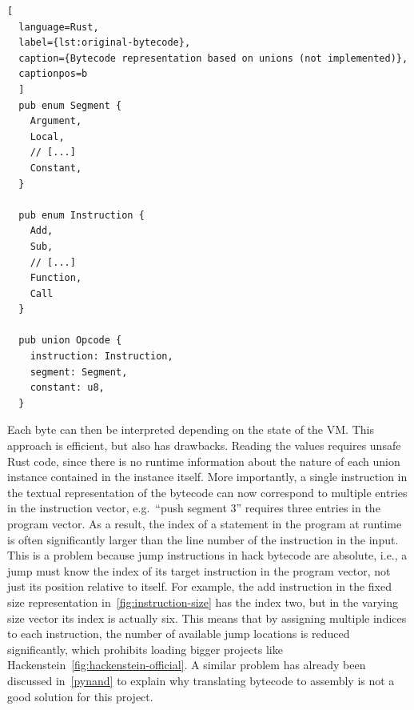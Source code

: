 \begin{lstlisting}[
  language=Rust,
  label={lst:original-bytecode},
  caption={Bytecode representation based on unions (not implemented)},
  captionpos=b
  ]
  pub enum Segment {
    Argument,
    Local,
    // [...]
    Constant,
  }

  pub enum Instruction {
    Add,
    Sub,
    // [...]
    Function,
    Call
  }

  pub union Opcode {
    instruction: Instruction,
    segment: Segment,
    constant: u8,
  }
\end{lstlisting}

Each byte can then be interpreted depending on the state of the VM.
This approach is efficient, but also has drawbacks.
Reading the values requires unsafe Rust code, since there is no runtime information about the nature of each union instance contained in the instance itself.
More importantly, a single instruction in the textual representation of the bytecode can now correspond to multiple entries in the instruction vector, e.g.\ ``push segment 3'' requires three entries in the program vector.
As a result, the index of a statement in the program at runtime is often significantly larger than the line number of the instruction in the input.
This is a problem because jump instructions in hack bytecode are absolute, i.e., a jump must know the index of its target instruction in the program vector, not just its position relative to itself.
For example, the add instruction in the fixed size representation in~\cref{fig:instruction-size} has the index two, but in the varying size vector its index is actually six.
This means that by assigning multiple indices to each instruction, the number of available jump locations is reduced significantly, which prohibits loading bigger projects like Hackenstein~\ref{fig:hackenstein-official}.
A similar problem has already been discussed in~\cref{pynand} to explain why translating bytecode to assembly is not a good solution for this project.

